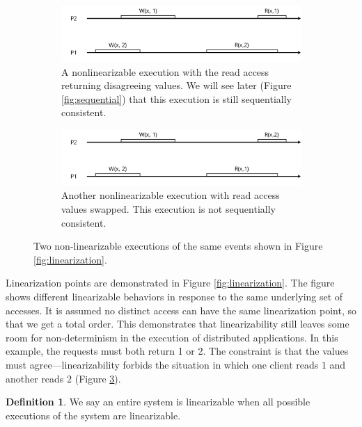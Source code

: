 \documentclass[]             %
{NASA}                       %
\theoremstyle{definition}
\newtheorem{definition}{Definition}[section]
\begin{document}
\begin{figure}[p]
  \begin{subfigure}[a]{1\textwidth}
    \center
    \includegraphics[scale=0.4]{images/nonlinear1.png}
    \caption{A nonlinearizable execution with the read access returning disagreeing values. We will see later (Figure \ref{fig:sequential}) that this execution is still sequentially consistent. }
    \label{fig:nonlinear1}
  \end{subfigure}
  \begin{subfigure}[b]{1\textwidth}
    \center
    \includegraphics[scale=0.4]{images/nonlinear2.png}
    \caption{Another nonlinearizable execution with read access values swapped. This execution is not sequentially consistent.}
    \label{fig:nonlinear2}
  \end{subfigure}
  \caption{Two non-linearizable executions of the same events shown in Figure \ref{fig:linearization}.}
  \label{fig:nonlinearizable}
\end{figure}

Linearization points are demonstrated in Figure \ref{fig:linearization}.
The figure shows different linearizable behaviors in response to the
same underlying set of accesses. It is assumed no distinct access can
have the same linearization point, so that we get a total order. This
demonstrates that linearizability still leaves some room for
non-determinism in the execution of distributed applications. In this
example, the requests must both return 1 or 2. The constraint is that
the values must agree---linearizability forbids the situation in which
one client reads \(1\) and another reads \(2\) (Figure
\ref{fig:nonlinearizable}).

\begin{definition}
  We say an entire system is linearizable when all
  possible executions of the system are linearizable.
\end{definition}
\end{document}
